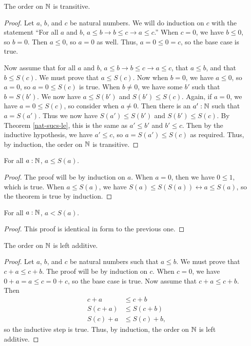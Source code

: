 \documentclass[../math.tex]{subfiles}
\begin{document}
\begin{instance}
    The order on $\mathbb{N}$ is transitive.
\end{instance}
\begin{proof}
    Let $a$, $b$, and $c$ be natural numbers.  We will do induction on $c$ with
    the statement ``For all $a$ and $b$, $a \leq b \rightarrow b \leq c
    \rightarrow a \leq c$.''  When $c = 0$, we have $b \leq 0$, so $b = 0$.
    Then $a \leq 0$, so $a = 0$ as well.  Thus, $a = 0 \leq 0 = c$, so the base
    case is true.

    Now assume that for all $a$ and $b$, $a \leq b \rightarrow b \leq c
    \rightarrow a \leq c$, that $a \leq b$, and that $b \leq S(c)$.  We must
    prove that $a \leq S(c)$.  Now when $b = 0$, we have $a \leq 0$, so $a = 0$,
    so $a = 0 \leq S(c)$ is true.  When $b \neq 0$, we have some $b'$ such that
    $b = S(b')$.  We now have $a \leq S(b')$ and $S(b') \leq S(c)$.  Again, if
    $a = 0$, we have $a = 0 \leq S(c)$, so consider when $a \neq 0$.  Then there
    is an $a' : \mathbb{N}$ such that $a = S(a')$.  Thus we now have $S(a') \leq S(b')$
    and $S(b') \leq S(c)$.  By Theorem \ref{nat-sucs-le}, this is the same as
    $a' \leq b'$ and $b' \leq c$.  Then by the inductive hypothesis, we have $a'
    \leq c$, so $a = S(a') \leq S(c)$ as required.  Thus, by induction, the
    order on $\mathbb{N}$ is transitive.
\end{proof}

\begin{theorem} \label{nat-le-suc}
    For all $a : \mathbb{N}$, $a \leq S(a)$.
\end{theorem}
\begin{proof}
    The proof will be by induction on $a$.  When $a = 0$, then we have $0 \leq
    1$, which is true.  When $a \leq S(a)$, we have $S(a) \leq S(S(a))
    \leftrightarrow a \leq S(a)$, so the theorem is true by induction.
\end{proof}

\begin{theorem} \label{nat-lt-suc}
    For all $a : \mathbb{N}$, $a < S(a)$.
\end{theorem}
\begin{proof}
    This proof is identical in form to the previous one.
\end{proof}

\begin{instance}
    The order on $\mathbb{N}$ is left additive.
\end{instance}
\begin{proof}
    Let $a$, $b$, and $c$ be natural numbers such that $a \leq b$.  We must
    prove that $c + a \leq c + b$.  The proof will be by induction on $c$.  When
    $c = 0$, we have $0 + a = a \leq c = 0 + c$, so the base case is true.  Now
    assume that $c + a \leq c + b$.  Then
    \begin{align*}
        c + a &\leq c + b \\
        S(c + a) &\leq S(c + b) \\
        S(c) + a &\leq S(c) + b,
    \end{align*}
    so the inductive step is true.  Thus, by induction, the order on $\mathbb{N}$ is
    left additive.
\end{proof}
\end{document}
